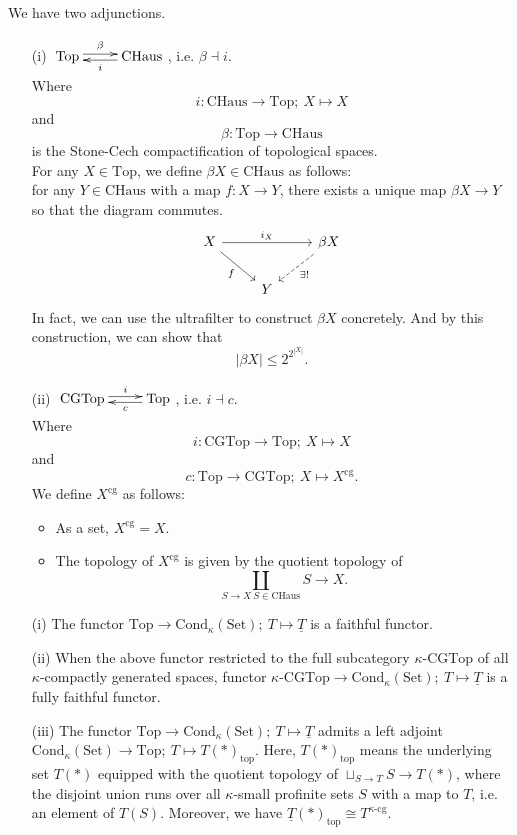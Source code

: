 \documentclass[UTF8,12,a4paper]{ctexart}
\theoremstyle{definition}
\begin{document}
\rem We have two adjunctions.
\begin{itemize}
	\item [(i)] 
$\xymatrix{\text{Top} \ar@<0.5ex>[r]^-\beta
	& \text{CHaus}\ar@<0.5ex>[l]^-i }$, i.e. $\beta \dashv i$.\\
 Where $$i:\text{CHaus}\rightarrow \text{Top};\ X\mapsto X$$ and $$\beta:\text{Top}\rightarrow \text{CHaus}$$ is the Stone-Cech compactification of topological spaces.\\
For any $X\in\text{Top}$, we define $\beta X\in \text{CHaus}$ as follows:\\
for any $Y\in\text{CHaus}$ with a map $f:X\to Y$, there exists a unique map $\beta X\to Y$ so that the diagram commutes.
$$
\begin{tikzcd}
X \arrow[rd, "f"'] \arrow[rr, "i_X"] &   & \beta X \arrow[ld, "\exists !", dashed] \\
& Y &                                        
\end{tikzcd}
$$
In fact, we can use the ultrafilter to construct $\beta X$ concretely. And by this construction, we can show that 
$$|\beta X|\leq 2^{2^{|X|}}.$$
	\item [(ii)]
	$\xymatrix{\text{CGTop} \ar@<0.5ex>[r]^-i
		& \text{Top}\ar@<0.5ex>[l]^-c }$, i.e. $i \dashv c$.\\
	Where $$i:\text{CGTop}\rightarrow\text{Top};\ X\mapsto X$$ and
	$$c:\text{Top}\rightarrow\text{CGTop};\ X\mapsto X^{\text{cg}}.$$
	We define $X^{\text{cg}}$ as follows:
	\begin{itemize}
		\item As a set, $X^{\text{cg}}=X$.
		\item The topology of $X^{\text{cg}}$ is given by the quotient topology of 
		$$\coprod_{S\to X\ S\in \text{CHaus}} S\longrightarrow X.$$
	\end{itemize}
\end{itemize}
  
\prop 
\begin{itemize}
	\item [(i)] The functor $\text{Top}\rightarrow \text{Cond}_\kappa (\text{Set});\ T\mapsto \underline{T}$ is a faithful functor.
	\item [(ii)] When the above functor restricted to the full subcategory $\kappa\text{-CGTop}$ of all $\kappa$-compactly generated spaces, functor $\kappa\text{-CGTop}\rightarrow \text{Cond}_\kappa (\text{Set});\ T\mapsto \underline{T}$ is a fully faithful functor.
	\item [(iii)] The functor $\text{Top}\rightarrow \text{Cond}_\kappa (\text{Set});\ T\mapsto \underline{T}$ admits a left adjoint $\text{Cond}_\kappa (\text{Set})\rightarrow\text{Top};\ T\mapsto T(*)_\text{top}$. Here, $T(*)_\text{top}$ means the underlying set $T(*)$ equipped with the quotient topology of $\sqcup_{S\to T} S\rightarrow T(*)$, where the disjoint union runs over all $\kappa$-small profinite sets $S$ with a map to $T$, i.e. an element of $T(S).$ Moreover, we have $ \underline{T}(*)_\text{top}\cong T^{\kappa\text{-cg}}.$
\end{itemize}
\end{document}
